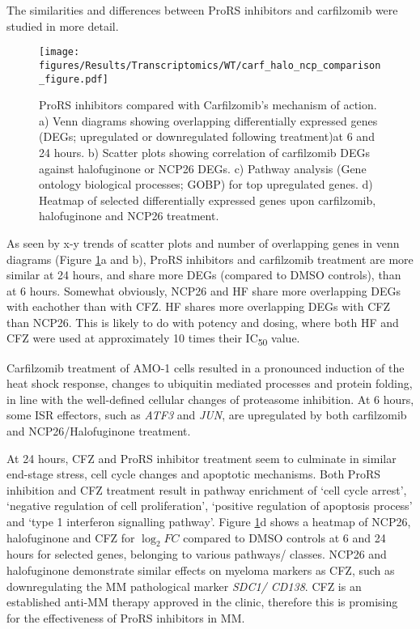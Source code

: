 The similarities and differences between ProRS inhibitors and carfilzomib were studied in more detail.
\begin{figure}[p]
\centering
\texttt{[image: figures/Results/Transcriptomics/WT/carf\_halo\_ncp\_comparison\_figure.pdf]}
\caption[ProRS inhibitors compared with Carfilzomib's mechanism of action]{ProRS inhibitors compared with Carfilzomib's mechanism of action.
a) Venn diagrams showing overlapping differentially expressed genes (DEGs; upregulated or downregulated following treatment)at 6 and 24 hours.
b) Scatter plots showing correlation of carfilzomib DEGs against halofuginone or NCP26 DEGs.
c) Pathway analysis (Gene ontology biological processes; GOBP) for top upregulated genes.
d) Heatmap of selected differentially expressed genes upon carfilzomib, halofuginone and NCP26 treatment.
}
\label{fig:wt_carf_compare}
\end{figure}
As seen by x-y trends of scatter plots and number of overlapping genes in venn diagrams (Figure \ref{fig:wt_carf_compare}a and b), ProRS inhibitors and carfilzomib treatment are more similar at 24 hours, and share more DEGs (compared to DMSO controls), than at 6 hours.
Somewhat obviously, NCP26 and HF share more overlapping DEGs with eachother than with CFZ\@.
HF shares more overlapping DEGs with CFZ than NCP26.
This is likely to do with potency and dosing, where both HF and CFZ were used at approximately 10 times their IC\textsubscript{50} value.

Carfilzomib treatment of AMO-1 cells resulted in a pronounced induction of the heat shock response, changes to ubiquitin mediated processes and protein folding, in line with the well-defined cellular changes of proteasome inhibition.
At 6 hours, some ISR effectors, such as \textit{ATF3} and \textit{JUN}, are upregulated by both carfilzomib and NCP26/Halofuginone treatment.

At 24 hours, CFZ and ProRS inhibitor treatment seem to culminate in similar end-stage stress, cell cycle changes and apoptotic mechanisms.
Both ProRS inhibition and CFZ treatment result in pathway enrichment of `cell cycle arrest', `negative regulation of cell proliferation', `positive regulation of apoptosis process' and `type 1 interferon signalling pathway'.
Figure \ref{fig:wt_carf_compare}d shows a heatmap of NCP26, halofuginone and CFZ for $\log_{2}FC$ compared to DMSO controls at 6 and 24 hours for selected genes, belonging to various pathways/ classes.
NCP26 and halofuginone demonstrate similar effects on myeloma markers as CFZ, such as downregulating the MM pathological marker \textit{SDC1/ CD138}.
CFZ is an established anti-MM therapy approved in the clinic, therefore this is promising for the effectiveness of ProRS inhibitors in MM.


